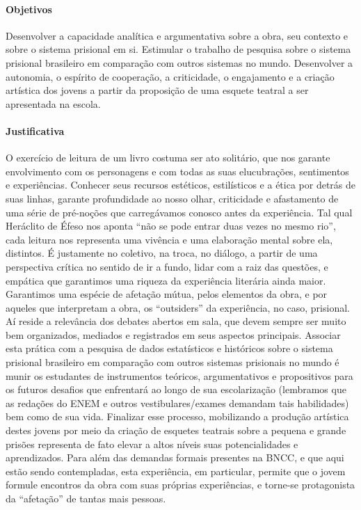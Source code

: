 \documentclass[11pt]{extarticle}
\begin{document}
\paragraph{Objetivos} Desenvolver a capacidade analítica e argumentativa
sobre a obra, seu contexto e sobre o sistema prisional em si. Estimular
o trabalho de pesquisa sobre o sistema prisional brasileiro em
comparação com outros sistemas no mundo. Desenvolver a autonomia, o
espírito de cooperação, a criticidade, o engajamento e a criação
artística dos jovens a partir da proposição de uma esquete teatral a ser
apresentada na escola.

\paragraph{Justificativa} O exercício de leitura de um livro costuma ser
ato solitário, que nos garante envolvimento com os personagens e com
todas as suas elucubrações, sentimentos e experiências. Conhecer seus
recursos estéticos, estilísticos e a ética por detrás de suas linhas,
garante profundidade ao nosso olhar, criticidade e afastamento de uma
série de pré-noções que carregávamos conosco antes da experiência. Tal
qual Heráclito de Éfeso nos aponta ``não se pode entrar duas vezes no
mesmo rio'', cada leitura nos representa uma vivência e uma elaboração
mental sobre ela, distintos. É justamente no coletivo, na troca, no
diálogo, a partir de uma perspectiva crítica no sentido de ir a fundo,
lidar com a raiz das questões, e empática que garantimos uma riqueza da
experiência literária ainda maior. Garantimos uma espécie de afetação
mútua, pelos elementos da obra, e por aqueles que interpretam a obra, os
``outsiders'' da experiência, no caso, prisional. Aí reside a relevância
dos debates abertos em sala, que devem sempre ser muito bem organizados,
mediados e registrados em seus aspectos principais. Associar esta
prática com a pesquisa de dados estatísticos e históricos sobre o
sistema prisional brasileiro em comparação com outros sistemas
prisionais no mundo é munir os estudantes de instrumentos teóricos,
argumentativos e propositivos para os futuros desafios que enfrentará ao
longo de sua escolarização (lembramos que as redações do ENEM e outros
vestibulares/exames demandam tais habilidades) bem como de sua vida.
Finalizar esse processo, mobilizando a produção artística destes jovens
por meio da criação de esquetes teatrais sobre a pequena e grande
prisões representa de fato elevar a altos níveis suas potencialidades e
aprendizados. Para além das demandas formais presentes na BNCC, e que
aqui estão sendo contempladas, esta experiência, em particular, permite
que o jovem formule encontros da obra com suas próprias experiências, e
torne-se protagonista da ``afetação'' de tantas mais pessoas.
\end{document}

